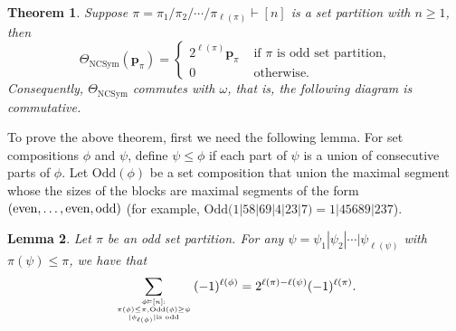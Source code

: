 \documentclass[11pt]{amsart}
\newtheorem{Theorem}{Theorem}[section]
\newtheorem{Lemma}[Theorem]{Lemma}
\numberwithin{equation}{section}
\newcommand{\NCSym}{\mathrm{NCSym}}
\newcommand{\odd}{\mathrm{Odd}}
\newcommand{\NCGamma}{\mathrm{NC}\Omega}
\begin{document}
\begin{Theorem}\label{thm:NCSym}
	Suppose $\pi=\pi_1/\pi_2/\cdots/\pi_{\ell(\pi)}\vdash[n]$ is a set partition with $n\geq 1$, then
	$$\Theta_{\NCSym}(\mathbf{p}_\pi)=\begin{cases}
		2^{\ell(\pi)}\mathbf{p}_\pi & \text{ if }\pi\text{ is odd set partition,}\\
		0 & \text{ otherwise.}
	\end{cases}$$
	Consequently, $\Theta_\NCSym$ commutes with $\omega$, that is, the following diagram is commutative.
	\begin{center}
	\end{center}
\end{Theorem}

To prove the above theorem, first we need the following lemma. For set compositions $\phi$ and $\psi$, define $\psi\leq \phi$ if  each part of $\psi$ is a union of consecutive parts of $\phi$. Let $\odd(\phi)$ be a set composition that union the maximal segment whose the sizes of the blocks are maximal segments of the form $({\rm even},\dots, {\rm even}, {\rm odd})$ (for example, $\odd(1| 58| 69| 4| 23|7) = 1| 45689| 237$).


\begin{Lemma}\label{lem:odd-set}
Let $\pi$ be an odd set partition. For any $\psi=\psi_1|\psi_2|\cdots|\psi_{\ell(\psi)}$ with $\pi(\psi)\leq \pi$, we have that $$\displaystyle\sum_{\phi\vDash[n]: \atop{ \pi(\phi)\leq \pi,\odd(\phi)\geq\psi \atop |\phi_{\ell(\phi)}|\text{is odd}}}(-1)^{\ell(\phi)}=2^{\ell(\pi)-\ell(\psi)}(-1)^{\ell(\pi)}.$$
\end{Lemma} 
\end{document}

